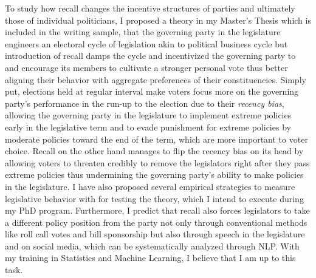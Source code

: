 \documentclass[hyphens, crop=false]{standalone}
\begin{document}
	To study how recall changes the incentive structures of parties
	and ultimately those of individual politicians,
	I proposed a theory in my Master's Thesis
	which is included in the writing sample,
	that the governing party in the legislature
	engineers an electoral cycle of legislation akin to political business cycle
	but introduction of recall damps
	the cycle and incentivized the governing party to 
	and encourage its members to cultivate a stronger personal vote
	thus better aligning their behavior with aggregate preferences of their constituencies.
	Simply put,
	elections held at regular interval make voters focus more
	on the governing party's performance in the run-up to the election
	due to their \textit{recency bias},
	allowing the governing party in the legislature to implement extreme policies
	early in the legislative term and to evade punishment for extreme policies
	by moderate policies toward the end of the term,
	which are more important to voter choice.
	Recall on the other hand
	manages to flip the recency bias on its head
	by allowing voters to threaten credibly to remove the legislators
	right after they pass extreme policies
	thus undermining the governing party's
	ability to make policies in the legislature.
	I have also proposed several empirical strategies
	to measure legislative behavior with 
	for testing the theory,
	which I intend to execute during my PhD
	program.
	Furthermore,
	I predict that recall
	also forces legislators to take a different policy position
	from the party
	not only through conventional methods like roll call votes
	and bill sponsorship
	but also through speech in the legislature and on social media,
	which can be systematically analyzed through NLP.
	With my training in Statistics and Machine Learning,
	I believe that I am up to this task.
	
\end{document}
